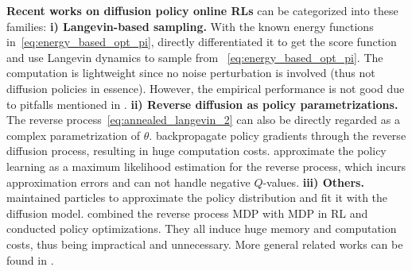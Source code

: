 \textbf{Recent works on diffusion policy online RLs} can be categorized into these families: \textbf{i) Langevin-based sampling.} With the known energy functions in~\eqref{eq:energy_based_opt_pi}, \citet{psenka2023learning,jain2024sampling} directly differentiated it to get the score function and use Langevin dynamics to sample from ~\eqref{eq:energy_based_opt_pi}. The computation is lightweight since no noise perturbation is involved (thus not diffusion policies in essence). However, the empirical performance is not good due to pitfalls mentioned in . \textbf{ii) Reverse diffusion as policy parametrizations.} The reverse process~\eqref{eq:annealed_langevin_2} can also be directly regarded as a complex parametrization of $\theta$. \citet{wang2024diffusion} backpropagate policy gradients through the reverse diffusion process, resulting in huge computation costs. \citet{ding2024diffusion} approximate the policy learning as a maximum likelihood estimation for the reverse process, which incurs approximation errors and can not handle negative $Q$-values. \textbf{iii) Others.}\citet{yang2023policy} maintained particles to approximate the policy distribution and fit it with the diffusion model. \cite{ren2024diffusion} combined the reverse process MDP with MDP in RL and conducted policy optimizations. They all induce huge memory and computation costs, thus being impractical and unnecessary. More general related works can be found in .


